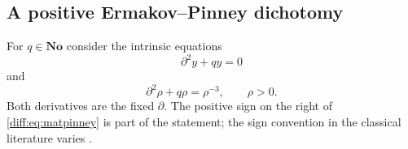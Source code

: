 \documentclass[11pt,letterpaper]{article}
\numberwithin{equation}{section}
\theoremstyle{definition}
\theoremstyle{remark}
\newcommand{\No}{\mathbf{No}}
\newcommand{\der}{\partial}
\begin{document}
\subsection{A positive Ermakov--Pinney dichotomy}
\label{diff:sub:matpinney}

For $q\in\No$ consider the intrinsic equations
\begin{equation}\label{diff:eq:matlinearq}
 \der^{2}y+qy=0
\end{equation}
and
\begin{equation}\label{diff:eq:matpinney}
 \der^{2}\rho+q\rho=\rho^{-3},\qquad \rho>0 .
\end{equation}
Both derivatives are the fixed $\der$. The positive sign on the right of
\cref{diff:eq:matpinney} is part of the statement; the sign convention in the
classical literature varies \cite{Pinney}.
\end{document}
